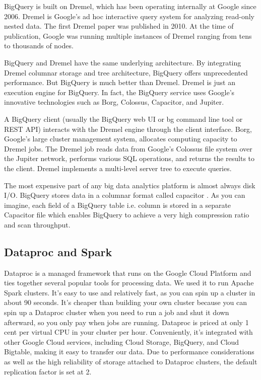\documentclass[a4paper,12pt]{article}
\begin{document}
BigQuery is built on  Dremel\cite{Dremel}, which has been operating internally at Google since 2006. Dremel is Google's
ad hoc interactive query system for analyzing read-only nested data. The first Dremel paper was published in 2010.
At the time of publication, Google was running multiple instances of Dremel ranging from tens to thousands of nodes.

BigQuery and Dremel have the same underlying architecture. By integrating Dremel columnar storage and tree architecture,
BigQuery offers unprecedented performance. But BigQuery is much better than Dremel. Dremel is just an execution engine for BigQuery. In fact, the BigQuery service uses Google's innovative technologies such as Borg\cite{Borg}, Colossus, Capacitor, and Jupiter.

A BigQuery client (usually the BigQuery web UI or bg command line tool or REST API) interacts with the Dremel engine
through the client interface. Borg, Google's large cluster management system, allocates computing capacity to Dremel
jobs. The Dremel job reads data from Google's Colossus file system over the Jupiter network, performs various SQL
operations, and returns the results to the client. Dremel implements a multi-level server tree to execute queries.

The most expensive part of any big data analytics platform is almost always disk I/O. BigQuery stores data in a columnar
format called capacitor\cite{StoringDremel} . As you can imagine, each field of a BigQuery table i.e. column is stored in
a separate Capacitor file which enables BigQuery to achieve a very high compression ratio and scan throughput.

\subsection{Dataproc and Spark}
\label{sec:spark}
Dataproc is a managed framework that runs on the Google Cloud Platform and ties together several popular tools for processing data.
We used it to run Apache Spark clusters. It's easy to use and relatively fast, as you can spin up a cluster in about 90 seconds.
It’s cheaper than building your own cluster because you can spin up a Dataproc cluster when you need to run a job and
shut it down afterward, so you only pay when jobs are running. Dataproc is priced at only 1 cent per virtual CPU in your
cluster per hour. Conveniently, it’s integrated with other Google Cloud services, including Cloud Storage, BigQuery, and
Cloud Bigtable, making it easy to transfer our data. Due to performance considerations as well as the high reliability of
storage attached to Dataproc clusters, the default replication factor is set at 2.
\end{document}
